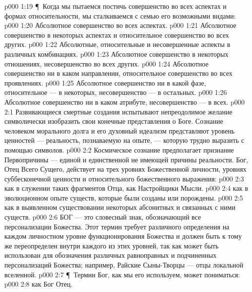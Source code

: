 \vs p000 1:19 \P\ Когда мы пытаемся постичь совершенство во всех аспектах и формах относительности, мы сталкиваемся с семью его возможными видами:
\vs p000 1:20 \bibnobreakspace Абсолютное совершенство во всех аспектах.
\vs p000 1:21 \bibnobreakspace Абсолютное совершенство в некоторых аспектах и относительное совершенство во всех других.
\vs p000 1:22 \bibnobreakspace Абсолютные, относительные и несовершенные аспекты в различных комбинациях.
\vs p000 1:23 \bibnobreakspace Абсолютное совершенство в некоторых отношениях, несовершенство во всех других.
\vs p000 1:24 \bibnobreakspace Абсолютное совершенство ни в каком направлении, относительное совершенство во всех проявлениях.
\vs p000 1:25 \bibnobreakspace Абсолютное совершенство ни в какой фазе, относительное --- в некоторых, несовершенство --- в остальных.
\vs p000 1:26 \bibnobreakspace Абсолютное совершенство ни в каком атрибуте, несовершенство --- в всех.
\vs p000 2:1 Развивающиеся смертные создания испытывают непреодолимое желание символически изобразить свои конечные представления о Боге. Сознание человеком морального долга и его духовный идеализм представляют уровень ценностей --- реальность, познаваемую на опыте, --- которую трудно выразить с помощью символов.
\vs p000 2:2 Космическое сознание предполагает признание Первопричины --- единой и единственной не имеющей причины реальности. Бог, Отец Всего Сущего, действует на трех уровнях Божественной личности, уровнях суббесконечной ценности и относительного божественного выражения:
\vs p000 2:3 \bibnobreakspace {} как в служении таких фрагментов Отца, как Настройщики Мысли.
\vs p000 2:4 \bibnobreakspace {} как в эволюционном опыте существ, которые были созданы или порождены.
\vs p000 2:5 \bibnobreakspace {} как в выявленном существовании некоторых абсонитных и связанных с ними существ.
\vs p000 2:6 БОГ --- это словесный знак, обозначающий все персонализации Божества. Этот термин требует различного определения на каждом личностном уровне функционирования Божества и должен быть к тому же переопределен внутри каждого из этих уровней, так как может быть использован для обозначения различных равноправных и подчиненных персонализаций Божества; например, Райские Сыны\hyp{}Творцы --- отцы локальной вселенной.
\vs p000 2:7 \P\ Термин Бог, как мы его используем, может пониматься:
\vs p000 2:8  как Бог Отец.
